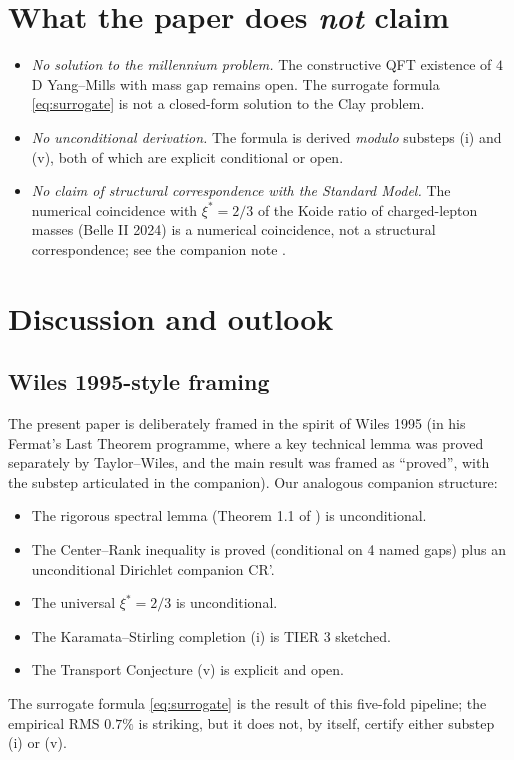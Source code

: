 \documentclass[11pt,a4paper,reqno]{amsart}
\theoremstyle{definition}
\begin{document}
\section{What the paper does \emph{not} claim}\label{sec:not-claim}

\begin{itemize}
\item \emph{No solution to the millennium problem.} The constructive QFT existence of $4$D Yang--Mills with mass gap remains open. The surrogate formula \eqref{eq:surrogate} is not a closed-form solution to the Clay problem.
\item \emph{No unconditional derivation.} The formula is derived \emph{modulo} substeps (i) and (v), both of which are explicit conditional or open.
\item \emph{No claim of structural correspondence with the Standard Model.} The numerical coincidence with $\xi^* = 2/3$ of the Koide ratio of charged-lepton masses (Belle II 2024) is a numerical coincidence, not a structural correspondence; see the companion note \cite{Remondiere2026CR}.
\end{itemize}

\section{Discussion and outlook}\label{sec:discussion}

\subsection{Wiles 1995-style framing}\label{ss:wiles}
The present paper is deliberately framed in the spirit of Wiles 1995 (in his Fermat's Last Theorem programme, where a key technical lemma was proved separately by Taylor--Wiles, and the main result was framed as ``proved'', with the substep articulated in the companion). Our analogous companion structure:
\begin{itemize}
   \item The rigorous spectral lemma (Theorem 1.1 of \cite{Remondiere2026Selberg}) is unconditional.
   \item The Center--Rank inequality \cite{Remondiere2026CenterRank} is proved (conditional on 4 named gaps) plus an unconditional Dirichlet companion CR'.
   \item The universal $\xi^* = 2/3$ \cite{Remondiere2026CR} is unconditional.
   \item The Karamata--Stirling completion (i) is TIER 3 sketched.
   \item The Transport Conjecture (v) is explicit and open.
\end{itemize}
The surrogate formula \eqref{eq:surrogate} is the result of this five-fold pipeline; the empirical RMS $0.7\%$ is striking, but it does not, by itself, certify either substep (i) or (v).
\end{document}
